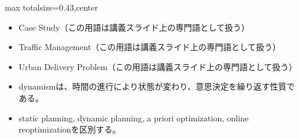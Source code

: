 \clearpage
{}
\begin{minipage}[t]{0.405\textwidth}
\begin{adjustbox}{max totalsize={\textwidth}{0.43\textheight},center}
\begin{minipage}{\textwidth}\scriptsize
{}\begin{itemize}
\item Case Study（この用語は講義スライド上の専門語として扱う）
\item Traffic Management（この用語は講義スライド上の専門語として扱う）
\item Urban Delivery Problem（この用語は講義スライド上の専門語として扱う）
\end{itemize}\begin{itemize}
\item dynamismは、時間の進行により状態が変わり、意思決定を繰り返す性質である。
\item static planning, dynamic planning, a priori optimization, online reoptimizationを区別する。
\end{itemize}
\end{minipage}
\end{adjustbox}
\end{minipage}\hfill
